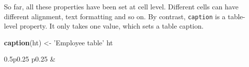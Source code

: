 \documentclass[]{article}
\newenvironment{Shaded}{\begin{snugshade}}{\end{snugshade}}
\newcommand{\KeywordTok}[1]{\textcolor[rgb]{0.13,0.29,0.53}{\textbf{#1}}}
\newcommand{\StringTok}[1]{\textcolor[rgb]{0.31,0.60,0.02}{#1}}
\newcommand{\NormalTok}[1]{#1}
\begin{document}
\FloatBarrier

So far, all these properties have been set at cell level. Different
cells can have different alignment, text formatting and so on. By
contrast, \texttt{caption} is a table-level property. It only takes one
value, which sets a table caption.

\begin{Shaded}
\begin{Highlighting}[]
\KeywordTok{caption}\NormalTok{(ht) <-}\StringTok{ 'Employee table'}
\NormalTok{ht}
\end{Highlighting}
\end{Shaded}

\begin{table}[h]
\centering\captionsetup{justification=centering,singlelinecheck=off}
\caption{Employee table}
\begin{tabularx}{0.5\textwidth}{p{} p{}}
 & 
\tabularnewline[-0.5pt]



\end{tabularx}
\end{table}
\end{document}
